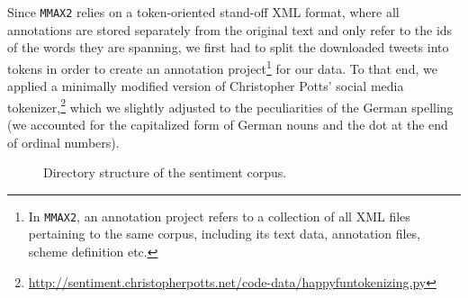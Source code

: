 Since \texttt{MMAX2} relies on a token-oriented stand-off XML format,
where all annotations are stored separately from the original text and
only refer to the ids of the words they are spanning, we first had to
split the downloaded tweets into tokens in order to create an
annotation project\footnote{In \texttt{MMAX2}, an annotation project
  refers to a collection of all XML files pertaining to the same
  corpus, including its text data, annotation files, scheme definition
  etc.} for our data.  To that end, we applied a minimally modified
version of Christopher Potts' social media
tokenizer,\footnote{\url{http://sentiment.christopherpotts.net/code-data/happyfuntokenizing.py}}
which we slightly adjusted to the peculiarities of the German spelling
(we accounted for the capitalized form of German nouns and the dot at
the end of ordinal numbers).

\begin{figure}
  \begin{minipage}[t][24.5em]{0.5\textwidth}%
    \hspace{3em}
  \end{minipage}

  \begin{minipage}[b]{0.5\textwidth}
  \caption{Directory structure of the sentiment
    corpus.\label{fig:snt:corpus}}%
  \end{minipage}
\end{figure}

